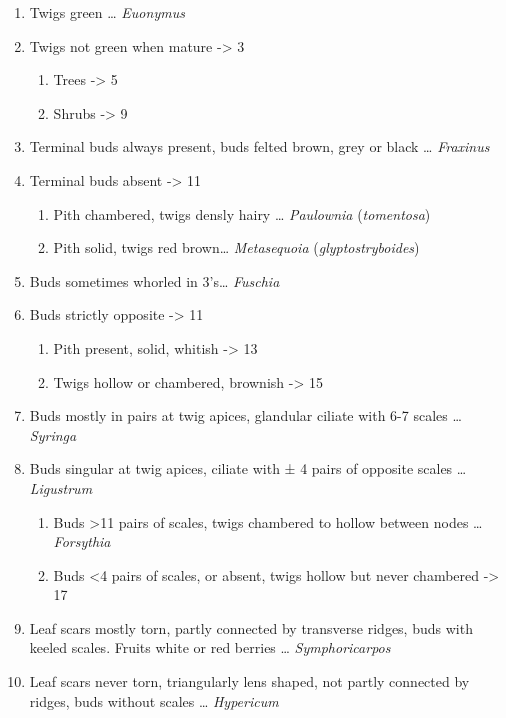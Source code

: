 \documentclass[openany]{book}
\providecommand{\tightlist}{%
  \setlength{\itemsep}{0pt}\setlength{\parskip}{0pt}}
\begin{document}
\begin{enumerate}
\def\labelenumi{\arabic{enumi}.}
\tightlist
\item
  Twigs green \ldots{} \emph{Euonymus}
\item
  Twigs not green when mature -\textgreater{} 3

  \begin{enumerate}
  \def\labelenumii{\arabic{enumii}.}
  \setcounter{enumii}{2}
  \tightlist
  \item
    Trees -\textgreater{} 5
  \item
    Shrubs -\textgreater{} 9
  \end{enumerate}
\item
  Terminal buds always present, buds felted brown, grey or black
  \ldots{} \emph{Fraxinus}
\item
  Terminal buds absent -\textgreater{} 11

  \begin{enumerate}
  \def\labelenumii{\arabic{enumii}.}
  \setcounter{enumii}{6}
  \tightlist
  \item
    Pith chambered, twigs densly hairy \ldots{} \emph{Paulownia}
    (\emph{tomentosa})
  \item
    Pith solid, twigs red brown\ldots{} \emph{Metasequoia}
    (\emph{glyptostryboides})
  \end{enumerate}
\item
  Buds sometimes whorled in 3's\ldots{} \emph{Fuschia}
\item
  Buds strictly opposite -\textgreater{} 11

  \begin{enumerate}
  \def\labelenumii{\arabic{enumii}.}
  \setcounter{enumii}{10}
  \tightlist
  \item
    Pith present, solid, whitish -\textgreater{} 13
  \item
    Twigs hollow or chambered, brownish -\textgreater{} 15
  \end{enumerate}
\item
  Buds mostly in pairs at twig apices, glandular ciliate with 6-7 scales
  \ldots{} \emph{Syringa}
\item
  Buds singular at twig apices, ciliate with ± 4 pairs of opposite
  scales \ldots{} \emph{Ligustrum}

  \begin{enumerate}
  \def\labelenumii{\arabic{enumii}.}
  \setcounter{enumii}{14}
  \tightlist
  \item
    Buds \textgreater{}11 pairs of scales, twigs chambered to hollow
    between nodes \ldots{} \emph{Forsythia}
  \item
    Buds \textless{}4 pairs of scales, or absent, twigs hollow but never
    chambered -\textgreater{} 17
  \end{enumerate}
\item
  Leaf scars mostly torn, partly connected by transverse ridges, buds
  with keeled scales. Fruits white or red berries \ldots{}
  \emph{Symphoricarpos}
\item
  Leaf scars never torn, triangularly lens shaped, not partly connected
  by ridges, buds without scales \ldots{} \emph{Hypericum}
\end{enumerate}
\end{document}
